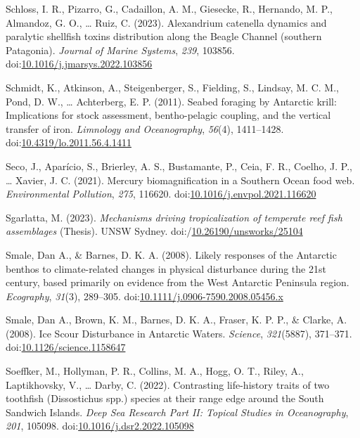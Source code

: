\documentclass[
]{article}
\newlength{\cslhangindent}
\newlength{\cslentryspacingunit} %
\newenvironment{CSLReferences}[2] %
 {%
  \setlength{\parindent}{0pt}
  \ifodd #1
  \let\oldpar\par
  \def\par{\hangindent=\cslhangindent\oldpar}
  \fi
  \setlength{\parskip}{#2\cslentryspacingunit}
 }%
 {}
\begin{document}
\begin{CSLReferences}{1}{0}
\leavevmode{}%
Schloss, I. R., Pizarro, G., Cadaillon, A. M., Giesecke, R., Hernando,
M. P., Almandoz, G. O., \ldots{} Ruiz, C. (2023). Alexandrium catenella
dynamics and paralytic shellfish toxins distribution along the {Beagle
Channel} (southern {Patagonia}). \emph{Journal of Marine Systems},
\emph{239}, 103856.
doi:\href{https://doi.org/10.1016/j.jmarsys.2022.103856}{10.1016/j.jmarsys.2022.103856}

\leavevmode{}%
Schmidt, K., Atkinson, A., Steigenberger, S., Fielding, S., Lindsay, M.
C. M., Pond, D. W., \ldots{} Achterberg, E. P. (2011). Seabed foraging
by {Antarctic} krill: {Implications} for stock assessment,
bentho-pelagic coupling, and the vertical transfer of iron.
\emph{Limnology and Oceanography}, \emph{56}(4), 1411--1428.
doi:\href{https://doi.org/10.4319/lo.2011.56.4.1411}{10.4319/lo.2011.56.4.1411}

\leavevmode{}%
Seco, J., Aparício, S., Brierley, A. S., Bustamante, P., Ceia, F. R.,
Coelho, J. P., \ldots{} Xavier, J. C. (2021). Mercury biomagnification
in a {Southern Ocean} food web. \emph{Environmental Pollution},
\emph{275}, 116620.
doi:\href{https://doi.org/10.1016/j.envpol.2021.116620}{10.1016/j.envpol.2021.116620}

\leavevmode{}%
Sgarlatta, M. (2023). \emph{Mechanisms driving tropicalization of
temperate reef fish assemblages} (Thesis). UNSW Sydney.
doi:/\href{https://doi.org/10.26190/unsworks/25104}{10.26190/unsworks/25104}

\leavevmode{}%
Smale, Dan A., \& Barnes, D. K. A. (2008). Likely responses of the
{Antarctic} benthos to climate-related changes in physical disturbance
during the 21st century, based primarily on evidence from the {West
Antarctic Peninsula} region. \emph{Ecography}, \emph{31}(3), 289--305.
doi:\href{https://doi.org/10.1111/j.0906-7590.2008.05456.x}{10.1111/j.0906-7590.2008.05456.x}

\leavevmode{}%
Smale, Dan A., Brown, K. M., Barnes, D. K. A., Fraser, K. P. P., \&
Clarke, A. (2008). Ice {Scour Disturbance} in {Antarctic Waters}.
\emph{Science}, \emph{321}(5887), 371--371.
doi:\href{https://doi.org/10.1126/science.1158647}{10.1126/science.1158647}

\leavevmode{}%
Soeffker, M., Hollyman, P. R., Collins, M. A., Hogg, O. T., Riley, A.,
Laptikhovsky, V., \ldots{} Darby, C. (2022). Contrasting life-history
traits of two toothfish ({Dissostichus} spp.) species at their range
edge around the {South Sandwich Islands}. \emph{Deep Sea Research Part
II: Topical Studies in Oceanography}, \emph{201}, 105098.
doi:\href{https://doi.org/10.1016/j.dsr2.2022.105098}{10.1016/j.dsr2.2022.105098}


\end{CSLReferences}
\end{document}
